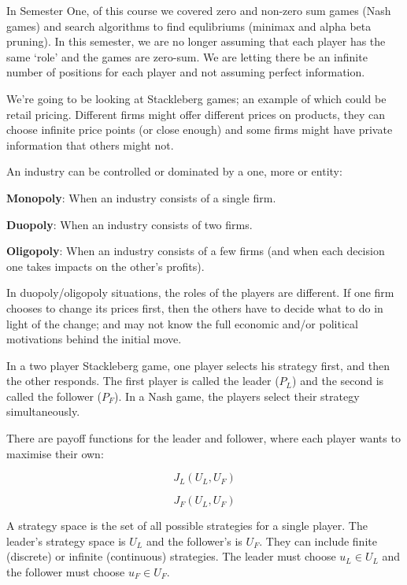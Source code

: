 
In Semester One, of this course we covered zero and non-zero sum games (Nash
games) and search algorithms to find equlibriums (minimax and alpha beta
pruning). In this semester, we are no longer assuming that each player has the
same `role' and the games are zero-sum. We are letting there be an infinite
number of positions for each player and not assuming perfect information.

We're going to be looking at Stackleberg games; an example of which could be
retail pricing. Different firms might offer different prices on products, they
can choose infinite price points (or close enough) and some firms might have
private information that others might not.

An industry can be controlled or dominated by a one, more or entity:

\begin{description}
  \item \textbf{Monopoly}: When an industry consists of a single firm.
  \item \textbf{Duopoly}: When an industry consists of two firms.
  \item \textbf{Oligopoly}: When an industry consists of a few firms (and when
  each decision one takes impacts on the other's profits).
\end{description}

In duopoly/oligopoly situations, the roles of the players are different. If one
firm chooses to change its prices first, then the others have to decide what to
do in light of the change; and may not know the full economic and/or political
motivations behind the initial move.

In a two player Stackleberg game, one player selects his strategy first, and
then the other responds. The first player is called the leader ($P_L$) and the
second is called the follower ($P_F$). In a Nash game, the players select their
strategy simultaneously.

There are payoff functions for the leader and follower, where each player wants
to maximise their own:

\[
  J_L(U_L, U_F)
\]

\[
  J_F(U_L, U_F)
\]

A strategy space is the set of all possible strategies for a single player. The
leader's strategy space is $U_L$ and the follower's is $U_F$. They can include
finite (discrete) or infinite (continuous) strategies. The leader must choose
$u_L \in U_L$ and the follower must choose $u_F \in U_F$.

